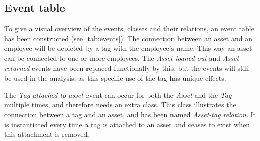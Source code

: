 \subsection{Event table}\label{ssc:eventtable}
To give a visual overview of the events, classes and their relations, an event table has been constructed (see \autoref{tab:events}). The connection between an asset and an employee will be depicted by a tag with the employee's name. This way an asset can be connected to one or more employees. The \textit{Asset loaned out} and \textit{Asset returned} events have been replaced functionally by this, but the events will still be used in the analysis, as this specific use of the tag has unique effects.
\par
The \textit{Tag attached to asset} event can occur for both the \textit{Asset} and the \textit{Tag} multiple times, and therefore needs an extra class. This class illustrates the connection between a tag and an asset, and has been named \textit{Asset-tag relation}. It is instantiated every time a tag is attached to an asset and ceases to exist when this attachment is removed.

